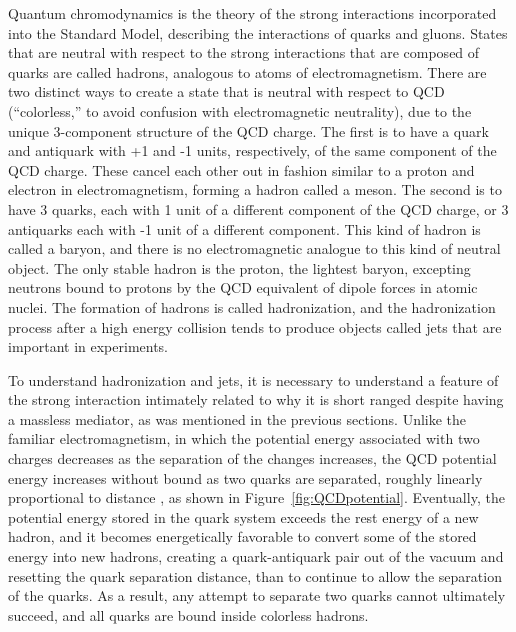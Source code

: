   Quantum chromodynamics is the theory of the strong interactions incorporated into the Standard Model, describing the interactions of quarks and gluons.
  States that are neutral with respect to the strong interactions that are composed of quarks are called hadrons, analogous to atoms of electromagnetism.
  There are two distinct ways to create a state that is neutral with respect to QCD (``colorless,'' to avoid confusion with electromagnetic neutrality), due to the unique 3-component structure of the QCD charge.
  The first is to have a quark and antiquark with +1 and -1 units, respectively, of the same component of the QCD charge.
  These cancel each other out in fashion similar to a proton and electron in electromagnetism, forming a hadron called a meson.
  The second is to have 3 quarks, each with 1 unit of a different component of the QCD charge, or 3 antiquarks each with -1 unit of a different component.
  This kind of hadron is called a baryon, and there is no electromagnetic analogue to this kind of neutral object.
  The only stable hadron is the proton, the lightest baryon, excepting neutrons bound to protons by the QCD equivalent of dipole forces in atomic nuclei.
  The formation of hadrons is called hadronization, and the hadronization process after a high energy collision tends to produce objects called jets that are important in experiments.
  
  To understand hadronization and jets, it is necessary to understand a feature of the strong interaction intimately related to why it is short ranged despite having a massless mediator, as was mentioned in the previous sections.
  Unlike the familiar electromagnetism, in which the potential energy associated with two charges decreases as the separation of the changes increases, the QCD potential energy increases without bound as two quarks are separated, roughly linearly proportional to distance \cite{lattice_potential}, as shown in Figure~\ref{fig:QCDpotential}.
  Eventually, the potential energy stored in the quark system exceeds the rest energy of a new hadron, and it becomes energetically favorable to convert some of the stored energy into new hadrons, creating a quark-antiquark pair out of the vacuum and resetting the quark separation distance, than to continue to allow the separation of the quarks.
  As a result, any attempt to separate two quarks cannot ultimately succeed, and all quarks are bound inside colorless hadrons. 

